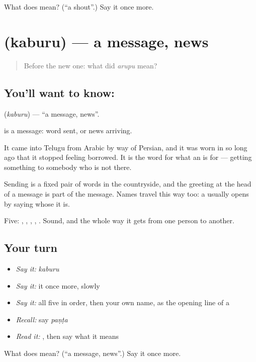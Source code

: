 \begin{tcolorbox}[breakable,colback=teal!4,colframe=teal!35!black,title={Before you move on}]
What does  mean? (\textquotedblleft{}a shout\textquotedblright{}.) Say it once more.
\end{tcolorbox}
\section[\texorpdfstring{\te{కబురు} (kaburu)}{కబురు (kaburu)}]{ (kaburu) — a message, news}

\label{lesson:TE-C68-message}



\begin{quote}
Before the new one: what did \emph{arupu} mean?
\end{quote}

\subsection*{You'll want to know: }
\textbf{} (\emph{kaburu}) — \textquotedblleft{}a message, news\textquotedblright{}.

 is a message: word sent, or news arriving.

It came into Telugu from Arabic by way of Persian, and it was worn in so long ago that it stopped feeling borrowed. It is the word for what an  is for — getting something to somebody who is not there.

Sending  is a fixed pair of words in the countryside, and the greeting at the head of a message is part of the message. Names travel this way too: a  usually opens by saying whose it is.

\begin{grammarlens}[title={What you've built}]
Five: , , , , . Sound, and the whole way it gets from one person to another.
\end{grammarlens}

\subsection*{Your turn}
\begin{itemize}
\raggedright
  \item \emph{Say it:} \emph{kaburu}
  \item \emph{Say it:} it once more, slowly
  \item \emph{Say it:} all five in order, then your own name, as the opening line of a 
  \item \emph{Recall:} say \emph{paṇṭa}
  \item \emph{Read it:} \textbf{}, then say what it means
\end{itemize}

\begin{tcolorbox}[breakable,colback=teal!4,colframe=teal!35!black,title={Before you move on}]
What does  mean? (\textquotedblleft{}a message, news\textquotedblright{}.) Say it once more.
\end{tcolorbox}
